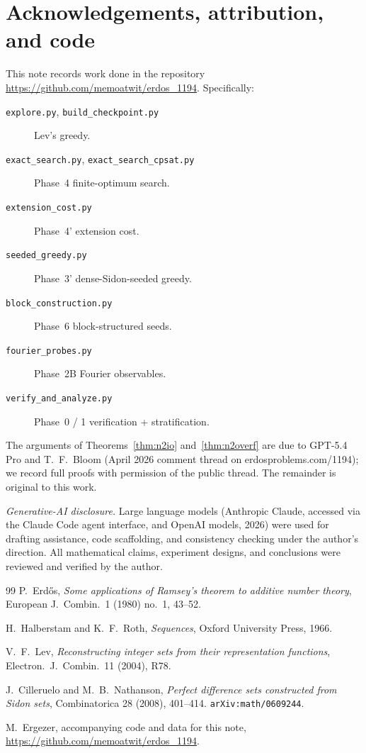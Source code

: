 \documentclass[11pt]{article}
\begin{document}
\section*{Acknowledgements, attribution, and code}

This note records work done in the repository
\url{https://github.com/memoatwit/erdos_1194}. Specifically:
\begin{description}
\item[\texttt{explore.py}, \texttt{build\_checkpoint.py}] Lev's greedy.
\item[\texttt{exact\_search.py}, \texttt{exact\_search\_cpsat.py}] Phase~4 finite-optimum search.
\item[\texttt{extension\_cost.py}] Phase~4' extension cost.
\item[\texttt{seeded\_greedy.py}] Phase~3' dense-Sidon-seeded greedy.
\item[\texttt{block\_construction.py}] Phase~6 block-structured seeds.
\item[\texttt{fourier\_probes.py}] Phase~2B Fourier observables.
\item[\texttt{verify\_and\_analyze.py}] Phase~0 / 1 verification + stratification.
\end{description}

The arguments of Theorems~\ref{thm:n2io} and~\ref{thm:n2overf} are due
to GPT-5.4 Pro and T.~F.~Bloom (April 2026 comment thread on
erdosproblems.com/1194); we record full proofs with permission of the
public thread. The remainder is original to this work.

\emph{Generative-AI disclosure.} Large language models (Anthropic
Claude, accessed via the Claude Code agent interface, and OpenAI
models, 2026) were used for drafting assistance, code scaffolding, and
consistency checking under the author's direction. All mathematical
claims, experiment designs, and conclusions were reviewed and verified
by the author.

\begin{thebibliography}{99}
 P.~Erd\H{o}s, \emph{Some applications of Ramsey's
  theorem to additive number theory}, European J.\ Combin.\ 1 (1980)
  no.~1, 43--52.

 H.~Halberstam and K.~F.~Roth, \emph{Sequences},
  Oxford University Press, 1966.

 V.~F.~Lev, \emph{Reconstructing integer sets from their
  representation functions}, Electron.\ J.\ Combin.\ 11 (2004), R78.

 J.~Cilleruelo and M.~B.~Nathanson, \emph{Perfect
  difference sets constructed from Sidon sets}, Combinatorica 28 (2008),
  401--414. \texttt{arXiv:math/0609244}.

 M.~Ergezer, accompanying code and data for this note,
  \url{https://github.com/memoatwit/erdos_1194}.
\end{thebibliography}
\end{document}
